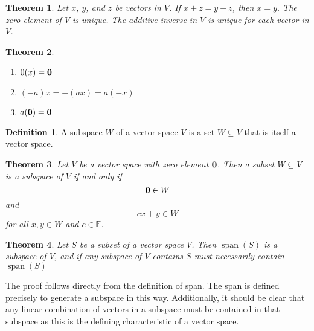 \documentclass[oneside, 12pt]{book}
\DeclareMathOperator{\spn}{span}
\newtheorem{thm}{Theorem}[section]
\theoremstyle{definition}
\newtheorem{defn}{Definition}[section]
\begin{document}
\begin{thm}
  \label{thm_canc}
  Let $x$, $y$, and $z$ be vectors in $V$. If $x+z=y+z$, then $x=y$.
  The zero element of $V$ is unique.
  The additive inverse in $V$ is unique for each vector in $V$.
\end{thm}
\begin{thm}
\label{thm_alg}

\begin{enumerate}
  \item $0(x)=\bold{0}$
  \item $(-a)x=-(ax)=a(-x)$
  \item $a(\bold{0})=\bold{0}$
\end{enumerate}

\end{thm}
\begin{defn}
\label{defn_subspace}
  A subspace $W$ of a vector space $V$ is a set $W \subseteq V$ that is itself a vector space.
\end{defn}
\begin{thm}
\label{thm_subspace}
  Let $V$ be a vector space with zero element $\bold{0}$. Then a subset $W \subseteq V$
  is a subspace of $V$ if and only if \[\bold{0} \in W\] and \[cx+y \in W\] for all $x,y \in W$ and $c \in \mathbb{F}$.

\end{thm}
\begin{thm}
\label{thm_spn}
Let $S$ be a subset of a vector space $V$. Then $\spn(S)$ is a subspace of $V$, and if any subspace of $V$ contains $S$ must necessarily contain $\spn(S)$
\end{thm}
The proof follows directly from the definition of span. The span is defined precisely to generate a subspace in this way. Additionally, it should be clear that any linear combination of vectors in a subspace must be contained in that subspace as this is the defining characteristic of a vector space.
\end{document}
